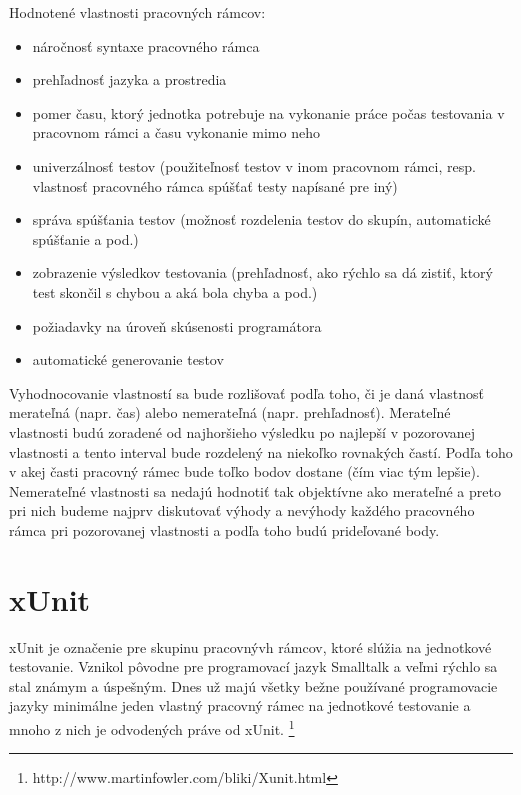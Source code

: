 \documentclass[11pt,twoside,slovak,a4paper]{article}
\begin{document}
	Hodnotené vlastnosti pracovných rámcov:
	\begin{itemize}
		\item náročnosť syntaxe pracovného rámca
		\item prehľadnosť jazyka a prostredia
		\item pomer času, ktorý jednotka potrebuje na vykonanie práce počas testovania v pracovnom rámci a času vykonanie mimo neho
		\item univerzálnosť testov (použiteľnosť testov v inom pracovnom rámci, resp. vlastnosť pracovného rámca spúšťať testy napísané pre iný)
		\item správa spúšťania testov (možnosť rozdelenia testov do skupín, automatické spúšťanie a pod.)
		\item zobrazenie výsledkov testovania (prehľadnosť, ako rýchlo sa dá zistiť, ktorý test skončil s chybou a aká bola chyba a pod.)
		\item požiadavky na úroveň skúsenosti programátora
		\item automatické generovanie testov
	\end{itemize}
	
	Vyhodnocovanie vlastností sa bude rozlišovať podľa toho, či je daná vlastnosť merateľná (napr. čas) alebo nemerateľná (napr. prehľadnosť). 
	Merateľné vlastnosti budú zoradené od najhoršieho výsledku po najlepší v pozorovanej vlastnosti a tento interval bude rozdelený na niekoľko rovnakých častí. Podľa toho v akej časti pracovný rámec bude toľko bodov dostane (čím viac tým lepšie). 
	Nemerateľné vlastnosti sa nedajú hodnotiť tak objektívne ako merateľné a preto pri nich budeme najprv diskutovať výhody a nevýhody každého pracovného rámca pri pozorovanej vlastnosti a podľa toho budú prideľované body.
	
	\newpage
	\thispagestyle{plain}
	\section{xUnit}
		xUnit je označenie pre skupinu pracovnývh rámcov, ktoré slúžia na jednotkové testovanie. Vznikol pôvodne pre programovací jazyk Smalltalk a veľmi rýchlo sa stal známym a úspešným. Dnes už majú všetky bežne používané programovacie jazyky minimálne jeden vlastný pracovný rámec na jednotkové testovanie a mnoho z nich je odvodených práve od xUnit. 		\footnote{http://www.martinfowler.com/bliki/Xunit.html} \newline
\end{document}

